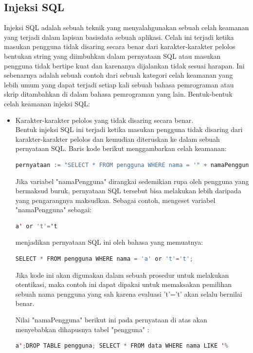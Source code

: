 \subsection{Injeksi SQL}
Injeksi SQL \cite{injeksi-sql} adalah sebuah teknik yang menyalahgunakan sebuah celah keamanan yang terjadi dalam lapisan basisdata sebuah aplikasi. Celah ini terjadi ketika masukan pengguna tidak disaring secara benar dari karakter-karakter pelolos bentukan string yang diimbuhkan dalam pernyataan SQL atau masukan pengguna tidak bertipe kuat dan karenanya dijalankan tidak sesuai harapan. Ini sebenarnya adalah sebuah contoh dari sebuah kategori celah keamanan yang lebih umum yang dapat terjadi setiap kali sebuah bahasa pemrograman atau skrip ditambahkan di dalam bahasa pemrograman yang lain. Bentuk-bentuk celah keamanan injeksi SQL:
\begin{itemize}
	\item Karakter-karakter pelolos yang tidak disaring secara benar.\\
	Bentuk injeksi SQL ini terjadi ketika masukan pengguna tidak disaring dari karakter-karakter pelolos dan kemudian diteruskan ke dalam sebuah pernyataan SQL. Baris kode berikut menggambarkan celah keamanan:
	\begin{lstlisting}[language=Java]
	pernyataan := "SELECT * FROM pengguna WHERE nama = '" + namaPengguna + "';"
\end{lstlisting}
	
	Jika variabel "namaPengguna" dirangkai sedemikian rupa oleh pengguna yang bermaksud buruk, pernyataan SQL tersebut bisa melakukan lebih daripada yang pengarangnya maksudkan. Sebagai contoh, mengeset variabel "namaPengguna" sebagai:
	\begin{lstlisting}[language=Java]
		a' or 't'='t
	\end{lstlisting}
	menjadikan pernyataan SQL ini oleh bahasa yang memuatnya:
	\begin{lstlisting}[language=Java]
		SELECT * FROM pengguna WHERE nama = 'a' or 't'='t';
	\end{lstlisting}
	Jika kode ini akan digunakan dalam sebuah prosedur untuk melakukan otentikasi, maka contoh ini dapat dipakai untuk memaksakan pemilihan sebuah nama pengguna yang sah karena evaluasi 't'='t' akan selalu bernilai benar.
	
	 Nilai "namaPengguna" berikut ini pada pernyataan di atas akan menyebabkan dihapusnya tabel "pengguna" :
	 
	\begin{lstlisting}[language=Java]
		a';DROP TABLE pengguna; SELECT * FROM data WHERE nama LIKE '%
	\end{lstlisting}
	

\end{itemize}
